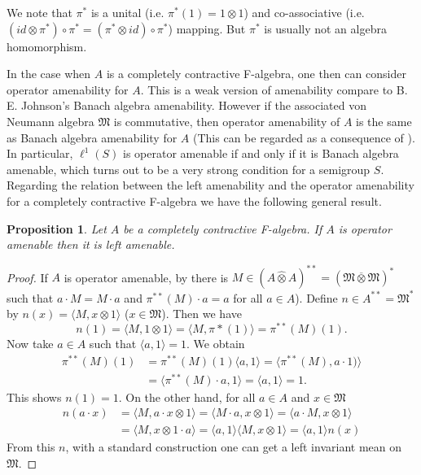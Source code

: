 \documentclass{tran-l}
\numberwithin{equation}{section}
\newtheorem{prop}[thm]{Proposition}
\theoremstyle{definition}
\theoremstyle{remark}
\begin{document}
We note that $\pi^*$ is a unital (i.e. $\pi^*(1)= 1\otimes 1$) and co-associative (i.e. $(id\otimes \pi^*)\circ \pi^* = (\pi^*\otimes id)\circ \pi^*$) mapping. But $\pi^*$ is usually not an algebra homomorphism.

In the case when $A$ is a completely contractive F-algebra, one then can consider operator amenability for $A$. This is a weak version of amenability compare to B. E. Johnson's Banach algebra amenability. However if the associated von Neumann algebra ${\mathfrak{M}}$ is commutative, then operator amenability of $A$ is the same as Banach algebra amenability for $A$ (This can be regarded as a consequence of \cite[Proposition~2.5]{Ruan_A(G)}). In particular, $\ell^1(S)$ is operator amenable if and only if it is Banach algebra amenable, which turns out to be a very strong condition for a semigroup $S$. Regarding the relation between the left amenability and the operator amenability for a completely contractive F-algebra we have the following general result.

\begin{prop}
Let $A$ be a completely contractive F-algebra. If $A$ is operator amenable then it is left amenable.
\end{prop}

\begin{proof}
If $A$ is operator amenable, by \cite[Proposition 2.4]{Ruan_A(G)} there is $M\in (A{\hat{\otimes}} A)^{**} = ({\mathfrak{M}}\overline\otimes {\mathfrak{M}})^*$ such that $a\cdot M = M\cdot a$ and $\pi^{**}(M)\cdot a = a$ for all $a\in A$). Define $n\in A^{**} ={\mathfrak{M}}^*$ by $n(x) = {\langle} M, x\otimes 1{\rangle}$ ($x\in {\mathfrak{M}}$). Then we have
\[
n(1) =  {\langle} M, 1\otimes 1{\rangle} =  {\langle} M, \pi*(1){\rangle} = \pi^{**}(M)(1).
\]
Now take $a\in A$ such that ${\langle} a, 1{\rangle} = 1$. We obtain
\begin{align*}
 \pi^{**}(M)(1) &=  \pi^{**}(M)(1){\langle} a, 1{\rangle} ={\langle} \pi^{**}(M), a\cdot 1){\rangle} \\
                &= {\langle} \pi^{**}(M)\cdot a, 1{\rangle} ={\langle} a, 1{\rangle} = 1.
\end{align*}
This shows $n(1) = 1$. On the other hand, for all $a\in A$ and $x\in {\mathfrak{M}}$
\begin{align*}
n(a\cdot x) &= {\langle} M, a\cdot x\otimes 1 {\rangle} = {\langle} M\cdot a, x\otimes 1 {\rangle} = {\langle} a\cdot M, x\otimes 1{\rangle} \\
&=  {\langle} M,  x\otimes 1\cdot a {\rangle} = {\langle} a, 1 {\rangle}  {\langle} M,  x\otimes 1 {\rangle} = {\langle} a, 1 {\rangle} n(x)
\end{align*}
From this $n$, with a standard construction one can get a left invariant mean on ${\mathfrak{M}}$.

\end{proof}
\end{document}
